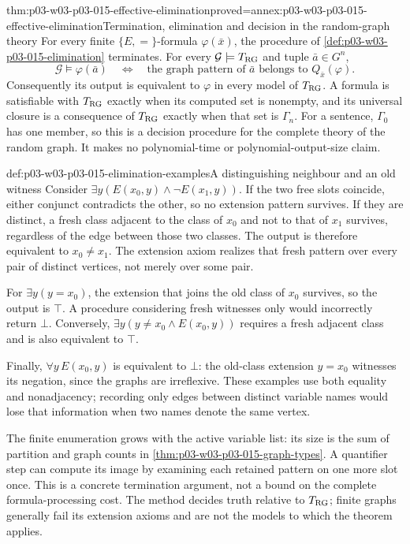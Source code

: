 \begin{hbtheorem}{thm:p03-w03-p03-015-effective-elimination}{proved=annex:p03-w03-p03-015-effective-elimination}{Termination, elimination and decision in the random-graph theory}
For every finite \(\{E,=\}\)-formula \(\varphi(\bar x)\), the procedure
of \cref{def:p03-w03-p03-015-elimination} terminates. For every
\(\mathcal G\models T_{\rm RG}\) and tuple \(\bar a\in G^n\),
\[
 \mathcal G\models\varphi(\bar a)
 \quad\Longleftrightarrow\quad
 \text{the graph pattern of \(\bar a\) belongs to
       \(Q_{\bar x}(\varphi)\)}.
\]
Consequently its output is equivalent to \(\varphi\) in every model of
\(T_{\rm RG}\). A formula is satisfiable with \(T_{\rm RG}\) exactly
when its computed set is nonempty, and its universal closure is a
consequence of \(T_{\rm RG}\) exactly when that set is \(\Gamma_n\).
For a sentence, \(\Gamma_0\) has one member, so this is a decision
procedure for the complete theory of the random graph. It makes no
polynomial-time or polynomial-output-size claim.
\end{hbtheorem}

\begin{hbexample}{def:p03-w03-p03-015-elimination-examples}{A distinguishing neighbour and an old witness}
Consider
\(\exists y(E(x_0,y)\land\neg E(x_1,y))\).
If the two free slots coincide, either conjunct contradicts the other,
so no extension pattern survives. If they are distinct, a fresh class
adjacent to the class of \(x_0\) and not to that of \(x_1\) survives,
regardless of the edge between those two classes. The output is therefore
equivalent to \(x_0\neq x_1\). The extension axiom realizes that fresh
pattern over every pair of distinct vertices, not merely over some pair.

For \(\exists y(y=x_0)\), the extension that joins the old class of
\(x_0\) survives, so the output is \(\top\). A procedure considering
fresh witnesses only would incorrectly return \(\bot\). Conversely,
\(\exists y(y\neq x_0\land E(x_0,y))\) requires a fresh adjacent
class and is also equivalent to \(\top\).

Finally, \(\forall y\,E(x_0,y)\) is equivalent to \(\bot\): the
old-class extension \(y=x_0\) witnesses its negation, since the graphs
are irreflexive. These examples use both equality and nonadjacency;
recording only edges between distinct variable names would lose that
information when two names denote the same vertex.
\end{hbexample}

The finite enumeration grows with the active variable list: its size is
the sum of partition and graph counts in
\cref{thm:p03-w03-p03-015-graph-types}. A quantifier step can compute
its image by examining each retained pattern on one more slot once.
This is a concrete termination argument, not a bound on the complete
formula-processing cost. The method decides truth relative to
\(T_{\rm RG}\); finite graphs generally fail its extension axioms and
are not the models to which the theorem applies.


